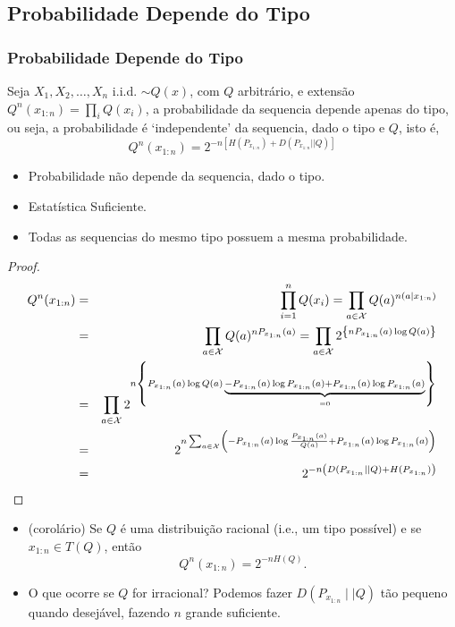 \subsection{Probabilidade Depende do Tipo}
\begin{frame}[allowframebreaks]
  \frametitle{Probabilidade Depende do Tipo}
  \begin{theorem}
	Seja $X_1, X_2, \ldots, X_n$ i.i.d. $\sim Q(x)$, com $Q$ arbitrário, e extensão 
	$Q^n(x_{1:n}) = \prod_i Q(x_i)$, a probabilidade da sequencia depende apenas do tipo, ou seja,
	a probabilidade é `independente' da sequencia, dado o tipo e $Q$, isto é,
	\begin{equation}
	Q^n(x_{1:n}) = 2^{-n[ H(P_{x_{1:n}}) + D(P_{x_{1:n}}||Q) ]}
	\end{equation}
  \end{theorem}
  \begin{itemize}
  \item Probabilidade não depende da sequencia, dado o tipo.
  \item Estatística Suficiente.
  \item Todas as sequencias do mesmo tipo possuem a mesma probabilidade.
  \end{itemize}

  \framebreak
  \begin{proof}
  \vspace{-0.2cm}
  \begin{eqnarray}
  Q^n(x_{1:n}) &=& \prod_{i=1}^{n} Q(x_i) = \prod_{a \in \mathcal{X}} Q(a)^{n(a \mid x_{1:n})} \nonumber \\
	&=& \prod_{a \in \mathcal{X}} Q(a)^{n P_{x_{1:n}}(a) } = \prod_{a \in \mathcal{X}} 2^{ \left\{ n P_{x_{1:n}}(a) \log Q(a) \right\} } \nonumber \\
	&=& \prod_{a \in \mathcal{X}} 2^{ n \left\{  P_{x_{1:n}}(a) \log Q(a) \KeepStyleUnderBrace{ -P_{x_{1:n}}(a) \log P_{x_{1:n}}(a) + P_{x_{1:n}}(a) \log P_{x_{1:n}}(a) }_{=0} \right\} } \nonumber \\
	&=& 2^{n \sum_{a \in \mathcal{X}}  \left( -P_{x_{1:n}}(a) \log \frac{P_{x_{1:n}}(a)}{Q(a)} + P_{x_{1:n}}(a) \log P_{x_{1:n}}(a) \right)  } \nonumber \\
	&=& 2^{-n \left( D(P_{x_{1:n}} \mid \mid Q) + H( P_{x_{1:n}} ) \right) }
  \end{eqnarray}
  \end{proof}

  \framebreak

  \begin{itemize}
  \item (corolário) Se $Q$ é uma distribuição racional (i.e., um tipo possível) e se $x_{1:n} \in T(Q)$, então
	\begin{equation}
	Q^n(x_{1:n}) = 2^{-n H(Q)} .
	\end{equation}
  \item O que ocorre se $Q$ for irracional? Podemos fazer $D(P_{x_{1:n}} \mid \mid Q)$  tão pequeno quando desejável,
	fazendo $n$ grande suficiente.
  \end{itemize}
\end{frame}


